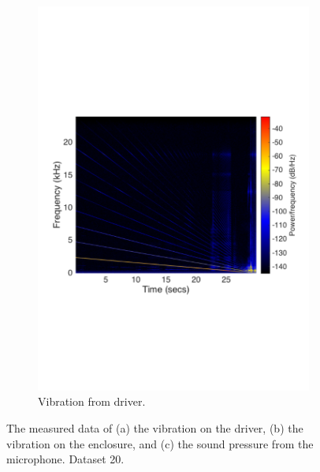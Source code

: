 \begin{figure}[H]
\begin{subfigure}[t]{0.47\textwidth}
	\includegraphics[width=1\textwidth]{figures/spectrogram_driver19.pdf}
	\caption{Vibration from driver.}
	\label{fig:spectrogram_driver19}
\end{subfigure}
\caption{The measured data of (a) the vibration on the driver, (b) the vibration on the enclosure, and (c) the sound pressure from the microphone. Dataset 20.}
\label{fig:spec_driver}
\end{figure} 





















